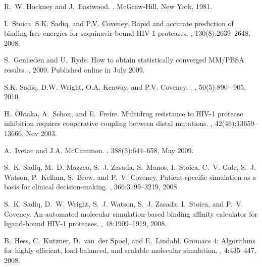 \begin{thebibliography}{10}
R.~W. Hockney and J.~Eastwood.
.
\newblock McGraw-Hill, New York, 1981.

I.~Stoica, S.K. Sadiq, and P.V. Coveney.
\newblock Rapid and accurate prediction of binding free energies for
  saquinavir-bound {HIV}-1 proteases.
, 130(8):2639--2648,
  2008.

S.~Genheden and U.~Ryde.
\newblock How to obtain statistically converged {MM/PBSA} results.
, 2009.
\newblock Published online in July 2009.

S.K. Sadiq, D.W. Wright, O.A. Kenway, and P.V. Coveney.
.
, 50(5):890-–905, 2010.

H.~Ohtaka, A.~Schon, and E.~Freire.
\newblock Multidrug resistance to {HIV-1} protease inhibition requires
  cooperative coupling between distal mutations.
, 42(46):13659--13666, Nov 2003.

A.~Ivetac and J.A. McCammon.
, 388(3):644--658, May 2009.

S.~K. Sadiq, M.~D. Mazzeo, S.~J. Zasada, S.~Manos, I.~Stoica, C.~V. Gale, S.~J.
  Watson, P.~Kellam, S.~Brew, and P.~V. Coveney.
\newblock Patient-specific simulation as a basis for clinical decision-making.
, 366:3199--3219, 2008.

S.~K. Sadiq, D.~W. Wright, S.~J. Watson, S.~J. Zasada, I.~Stoica, and P.~V.
  Coveney.
\newblock An automated molecular simulation-based binding affinity calculator
  for ligand-bound {HIV}-1 proteases.
, 48:1909--1919,
  2008.

B.~Hess, C.~Kutzner, D.~van~der Spoel, and E.~Lindahl.
\newblock Gromacs 4: Algorithms for highly efficient, load-balanced, and
  scalable molecular simulation.
, 4:435--447, 2008.


\end{thebibliography}
